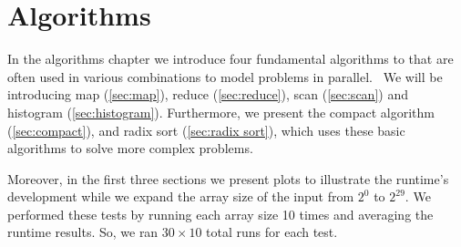 \chapter{Algorithms}
\label{chap:algorithms}

In the algorithms chapter we introduce four fundamental algorithms to that are often used in various combinations to model problems in parallel.~\cite{udacity}
We will be introducing map (\cref{sec:map}), reduce (\cref{sec:reduce}), scan (\cref{sec:scan}) and histogram (\cref{sec:histogram}).
Furthermore, we present the compact algorithm (\cref{sec:compact}), and radix sort (\cref{sec:radix sort}), which uses these basic algorithms to solve more complex problems.

Moreover, in the first three sections we present plots to illustrate the runtime's development while we expand the array size of the input from $2^0$ to $2^{29}$.
We performed these tests by running each array size 10 times and averaging the runtime results.
So, we ran $30 \times 10$ total runs for each test.








